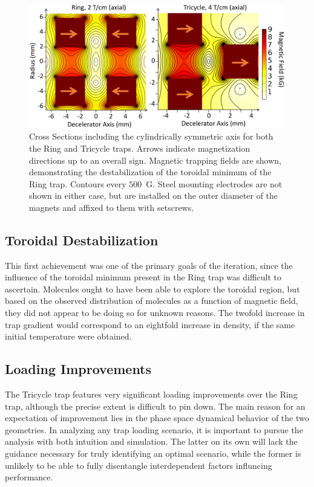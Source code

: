 \documentclass[defaultstyle,11pt]{thesis}
\begin{document}
\begin{figure}[t!]
\includegraphics[width=\linewidth]{RingTricycle.png}
\caption[Ring and Tricycle Trap Comparison]{\label{ringtricyclefigure}
Cross Sections including the cylindrically symmetric axis for both the Ring and Tricycle traps. Arrows indicate magnetization directions up to an overall sign. Magnetic trapping fields are shown, demonstrating the destabilization of the toroidal minimum of the Ring trap. Contours every $500$~G. Steel mounting electrodes are not shown in either case, but are installed on the outer diameter of the magnets and affixed to them with setscrews.
}
\end{figure}

\subsection{Toroidal Destabilization}

This first achievement was one of the primary goals of the iteration, since the influence of the toroidal minimum present in the Ring trap was difficult to ascertain. 
Molecules ought to have been able to explore the toroidal region, but based on the observed distribution of molecules as a function of magnetic field, they did not appear to be doing so for unknown reasons.
The twofold increase in trap gradient would correspond to an eightfold increase in density, if the same initial temperature were obtained.

\subsection{Loading Improvements}

The Tricycle trap features very significant loading improvements over the Ring trap, although the precise extent is difficult to pin down. 
The main reason for an expectation of improvement lies in the phase space dynamical behavior of the two geometries.
In analyzing any trap loading scenario, it is important to pursue the analysis with both intuition and simulation.
The latter on its own will lack the guidance necessary for truly identifying an optimal scenario, while the former is unlikely to be able to fully disentangle interdependent factors influncing performance.
\end{document}
